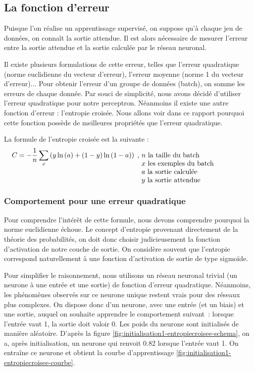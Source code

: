 \subsection{La fonction d'erreur}

Puisque l'on réalise un apprentissage supervisé, on suppose qu'à chaque jeu de données, on connaît la sortie attendue. Il est alors nécessaire
de mesurer l'erreur entre la sortie attendue et la sortie calculée par le réseau neuronal.

Il existe plusieurs formulations de cette erreur, telles que l'erreur quadratique (norme euclidienne du vecteur d'erreur), l'erreur moyenne (norme 1 du vecteur d'erreur)... 
Pour obtenir l'erreur d'un groupe de données (batch), on somme les erreurs de chaque donnée. Par souci de simplicité, nous avons décidé d'utiliser
l'erreur quadratique pour notre perceptron. Néanmoins il existe une autre fonction d'erreur : l'entropie croisée. Nous allons voir dans ce rapport pourquoi 
cette fonction possède de meilleures propriétés que l'erreur quadratique.

La formule de l'entropie croisée est la suivante : 
\begin{equation}
 C = -\frac{1}{n}\sum_x\left(y\ln\left(a\right) + \left(1-y\right)\ln\left(1-a\right)\right)\; \text{, \parbox[t]{15em}{$n$ la taille du batch\\ $x$ les exemples du batch\\
 $a$ la sortie calculée\\$y$ la sortie attendue}}
 \label{eq:formule-entropiecroisee}
\end{equation}

\subsubsection{Comportement pour une erreur quadratique}

Pour comprendre l'intérêt de cette formule, nous devons comprendre pourquoi la norme euclidienne échoue. Le concept d'entropie provenant 
directement de la théorie des probabilités, on doit donc choisir judicieusement la fonction d'activation de notre couche de sortie. On 
considère souvent que l'entropie correspond naturellement à une fonction d'activation de sortie de type sigmoïde. 

Pour simplifier le raisonnement, nous utilisons un réseau neuronal trivial (un neurone à une entrée et une sortie) de fonction d'erreur quadratique. 
Néanmoins, les phénomènes observés sur ce neurone unique restent vrais pour des réseaux plus complexes. On dispose donc d'un neurone, avec une entrée (et un biais) et 
une sortie, auquel on souhaite apprendre le comportement suivant~: lorsque l'entrée vaut 1, la sortie doit valoir 0.
Les poids du neurone sont initialisés de manière aléatoire. D'après la figure \ref{fig:initialisation1-entropiecroisee-schema}, on a, après initialisation,
un neurone qui renvoit 0.82 lorsque l'entrée vaut 1. On entraîne ce neurone et obtient la courbe d'apprentissage 
\ref{fig:initialisation1-entropiecroisee-courbe}.


